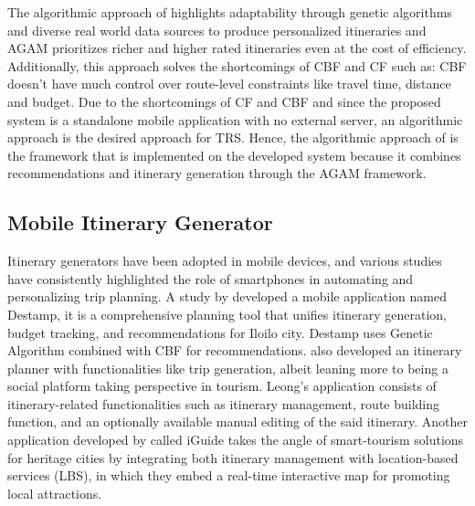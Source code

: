 The algorithmic approach of \textcite{Yochum2020} highlights adaptability through genetic algorithms and diverse real world data sources to produce personalized itineraries and AGAM prioritizes richer and higher rated itineraries even at the cost of efficiency. Additionally, this approach solves the shortcomings of CBF and CF such as: CBF doesn’t have much control over route-level constraints like travel time, distance and budget. Due to the shortcomings of CF and CBF and since the proposed system is a standalone mobile application with no external server, an algorithmic approach is the desired approach for TRS. Hence, the algorithmic approach of \textcite{Yochum2020} is the framework that is implemented on the developed system because it combines recommendations and itinerary generation through the AGAM framework.

\subsection{Mobile Itinerary Generator}

Itinerary generators have been adopted in mobile devices, and various studies have consistently highlighted the role of smartphones in automating and personalizing trip planning. A study by \textcite{Estilo2023} developed a mobile application named Destamp, it is a comprehensive planning tool that unifies itinerary generation, budget tracking, and recommendations for Iloilo city. Destamp uses Genetic Algorithm combined with CBF for recommendations. \textcite{Loh2022} also developed an itinerary planner with functionalities like trip generation, albeit leaning more to being a social platform taking perspective in tourism. Leong’s application consists of itinerary-related functionalities such as itinerary management, route building function, and an optionally available manual editing of the said itinerary. Another application developed by \textcite{Rahman2025} called iGuide takes the angle of smart-tourism solutions for heritage cities by integrating both itinerary management with location-based services (LBS), in which they embed a real-time interactive map for promoting local attractions.

